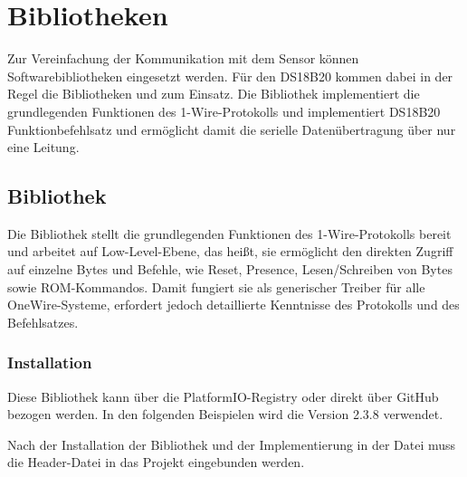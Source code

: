 \section{Bibliotheken}
	Zur Vereinfachung der Kommunikation mit dem Sensor können Softwarebibliotheken eingesetzt werden. Für den DS18B20 kommen dabei in der Regel die Bibliotheken  und  zum Einsatz. Die Bibliothek  implementiert die grundlegenden Funktionen des 1-Wire-Protokolls und   implementiert DS18B20 Funktionbefehlsatz und ermöglicht damit die serielle Datenübertragung über nur eine Leitung.


\subsection{Bibliothek  \label{bib:oneWire}}
	Die Bibliothek  stellt die grundlegenden Funktionen des 1-Wire-Protokolls bereit und arbeitet auf Low-Level-Ebene, das hei{\ss}t, sie ermöglicht den direkten Zugriff auf einzelne Bytes und Befehle, wie Reset, Presence, Lesen/Schreiben von Bytes sowie ROM-Kommandos. Damit fungiert sie als generischer Treiber für alle OneWire-Systeme, erfordert jedoch detaillierte Kenntnisse des Protokolls und des Befehlsatzes.
	
	\subsubsection{Installation}
	Diese Bibliothek kann über die PlatformIO-Registry \cite{Stoffregen:2025PIO} oder direkt über GitHub \cite{Stoffregen:2025GIT} bezogen werden. In den folgenden Beispielen wird die Version 2.3.8 verwendet.  
	
	Nach der Installation der Bibliothek und der Implementierung in der Datei  muss die Header-Datei  in das Projekt eingebunden werden.
	
	
